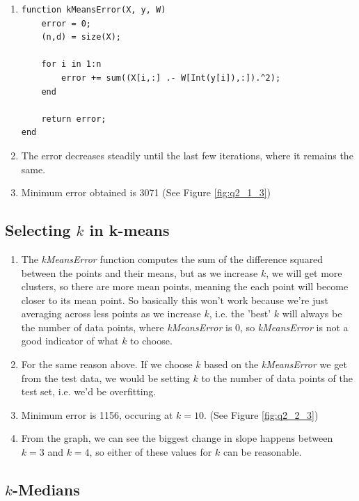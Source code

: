 \documentclass{article}
\def\enum#1{\begin{enumerate}#1\end{enumerate}}
\begin{document}
\begin{enumerate}
 \item
\begin{verbatim}
function kMeansError(X, y, W)
    error = 0;
    (n,d) = size(X);

    for i in 1:n
        error += sum((X[i,:] .- W[Int(y[i]),:]).^2);
    end

    return error;
end
\end{verbatim}

 \item The error decreases steadily until the last few iterations, where it remains the same.
 \item Minimum error obtained is 3071 (See Figure \ref{fig:q2_1_3})
\end{enumerate}
 
 \subsection{Selecting $k$ in k-means}
  
 \enum{
 \item The \emph{kMeansError} function computes the sum of the difference squared between the points and their means, but as we increase $k$, we will get more clusters, so there are more mean points, meaning the each point will become closer to its mean point. So basically this won't work because we're just averaging across less points as we increase $k$, i.e. the 'best' $k$ will always be the number of data points, where \emph{kMeansError} is 0, so \emph{kMeansError} is not a good indicator of what $k$ to choose.
 \item For the same reason above. If we choose $k$ based on the \emph{kMeansError} we get from the test data, we would be setting $k$ to the number of data points of the test set, i.e. we'd be overfitting.
 \item Minimum error is 1156, occuring at $k = 10$. (See Figure \ref{fig:q2_2_3})
 \item From the graph, we can see the biggest change in slope happens between $k=3$ and $k=4$, so either of these values for $k$ can be reasonable. 
 }
 
 \subsection{$k$-Medians}
 
\end{document}
